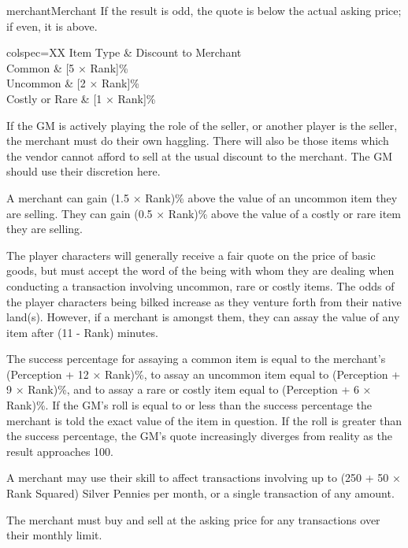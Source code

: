 \begin{Skill}[1.1]{merchant}{Merchant}
If the result is odd, the quote is below the actual asking price; if
even, it is above.

\begin{dqtblr}{colspec={XX}}
Item Type	& Discount to Merchant  \\
Common		& [5 × Rank]\% \\
Uncommon	& [2 × Rank]\% \\ 
Costly or Rare	& [1 × Rank]\% \\
\end{dqtblr}

If the GM is actively playing the role of the seller, or another
player is the seller, the merchant must do their own haggling.  There
will also be those items which the vendor cannot afford to sell at the
usual discount to the merchant.  The GM should use their discretion
here.


A merchant can gain (1.5 × Rank)\% above the value of an uncommon item
they are selling.  They can gain (0.5 × Rank)\% above the value of a
costly or rare item they are selling.


The player characters will generally receive a fair quote on the price
of basic goods, but must accept the word of the being with whom they
are dealing when conducting a transaction involving uncommon, rare or
costly items.  The odds of the player characters being bilked increase
as they venture forth from their native land(s). However, if a
merchant is amongst them, they can assay the value of any item after
(11 - Rank) minutes.

The success percentage for assaying a common item is equal to the
merchant’s (Perception + 12 × Rank)\%, to assay an uncommon item equal
to (Perception + 9 × Rank)\%, and to assay a rare or costly item equal
to (Perception + 6 × Rank)\%.  If the GM’s roll is equal to or less
than the success percentage the merchant is told the exact value of
the item in question.  If the roll is greater than the success
percentage, the GM’s quote increasingly diverges from reality as the
result approaches 100.

A merchant may use their skill to affect transactions involving up to
(250 + 50 × Rank Squared) Silver Pennies per month, or a single
transaction of any amount.

The merchant must buy and sell at the asking price for any
transactions over their monthly limit.


\end{Skill}
